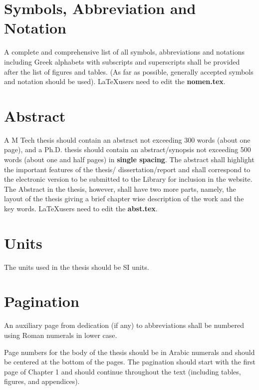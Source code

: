 \section{Symbols, Abbreviation and Notation}
A complete and comprehensive list of all symbols, abbreviations and notations including Greek alphabets with subscripts and superscripts shall be provided after the list of   figures and tables. (As far as possible, generally accepted symbols and notation should be used). \LaTeX users need to edit the \textbf{nomen.tex}.
\section{Abstract}
A M Tech thesis should contain an abstract not exceeding 300 words (about one page), and a Ph.D. thesis should contain an abstract/synopsis not exceeding 500 words (about one and half pages) in \textbf{single spacing}. The abstract shall highlight the important features of the thesis/ dissertation/report and shall correspond to the electronic version to be submitted to the Library for inclusion in the website. The Abstract in the thesis, however, shall have two more parts, namely, the layout of the thesis giving a brief chapter wise description of the work and the key words. \LaTeX users need to edit the \textbf{abst.tex}.
\section{Units}
The units used in the thesis should be SI units.
\section{Pagination}
An auxiliary page from dedication (if any) to abbreviations shall be numbered using Roman numerals in lower case.

Page numbers for the body of the thesis should be in Arabic numerals and should be centered at the bottom of the pages. The pagination should start with the first page of Chapter 1 and should continue throughout the text (including tables, figures, and appendices).

